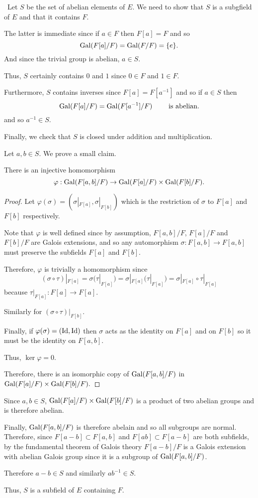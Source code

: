 \documentclass[12pt]{AlgebraQual}
\begin{document}
\begin{solution}$\,$
Let $S$ be the set of abelian elements of $E$. We need to show that $S$ is a subgfield of $E$ and that it contains $F.$

The latter is immediate since if $a\in F$ then $F[a]=F$ and so $$\text{Gal}(F[a]/F)=\text{Gal}(F/F)=\{e\}.$$ And since the trivial group is abelian, $a\in S$.

Thus, $S$ certainly contains $0$ and $1$ since $0\in F$ and $1\in F$.

Furthermore, $S$ contains inverses since $F[a]=F[a^{-1}]$ and so if $a\in S$ then $$\text{Gal}(F[a]/F)=\text{Gal}(F[a^{-1}]/F)\qquad\text{ is abelian.}$$ and so $a^{-1}\in S.$

Finally, we check that $S$ is closed under addition and multiplication.

Let $a,b\in S$. We prove a small claim.

\begin{claim} There is an injective homomorphism $$\varphi:\text{Gal}(F[a,b]/F)\to\text{Gal}(F[a]/F)\times\text{Gal}(F[b]/F).$$
\begin{proof} Let $\varphi(\sigma)=(\sigma|_{F[a]},\sigma|_{F[b]})$ which is the restriction of $\sigma$ to $F[a]$ and $F[b]$ respectively.

Note that $\varphi$ is well defined since by assumption, $F[a,b]/F$, $F[a]/F$ and $F[b]/F$ are Galois extensions, and so any automorphism $\sigma:F[a,b]\to F[a,b]$ must preserve the subfields $F[a]$ and $F[b]$.

Therefore, $\varphi$ is trivially a homomorphism since $$(\sigma\circ\tau)|_{F[a]}=\sigma(\tau|_{F[a]})=\sigma|_{F[a]}(\tau|_{F[a]})=\sigma|_{F[a]}\circ\tau|_{F[a]}$$ because $\tau|_{F[a]}:F[a]\to F[a]$.

Similarly for $(\sigma\circ\tau)|_{F[b]}$.

Finally, if $\varphi(\sigma)=(\text{Id},\text{Id})$ then $\sigma$ acts as the identity on $F[a]$ and on $F[b]$ so it must be the identity on $F[a,b]$.

Thus, $\ker\varphi=0$.

Therefore, there is an isomorphic copy of $\text{Gal}(F[a,b]/F)$ in $\text{Gal}(F[a]/F)\times\text{Gal}(F[b]/F).$
\end{proof}
\end{claim}

Since $a,b\in S$, $\text{Gal}(F[a]/F)\times\text{Gal}(F[b]/F)$ is a product of two abelian groups and is therefore abelian.

Finally, $\text{Gal}(F[a,b]/F)$ is therefore abelain  and so all subgroups are normal. Therefore, since $F[a-b]\subset F[a,b]$ and $F[ab]\subset F[a-b]$ are both subfields, by the fundamental theorem of Galois theory $F[a-b]/F$ is a Galois extension with abelian Galois group since it is a subgroup of $\text{Gal}(F[a,b]/F)$.

Therefore $a-b\in S$ and similarly $ab^{-1}\in S$.

Thus, $S$ is a subfield of $E$ containing $F$.
\end{solution}
\newpage
\end{document}
